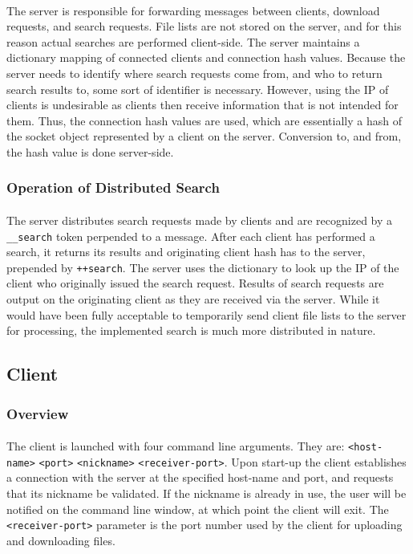 \documentclass[10pt,a4paper]{article}
\begin{document}
\paragraph{} 
The server is responsible for forwarding messages between clients, download requests, and search requests. File lists are not stored on the server, and for this reason actual searches are performed client-side. The server maintains a dictionary mapping of connected clients and connection hash values. Because the server needs to identify where search requests come from, and who to return search results to, some sort of identifier is necessary. However, using the IP of clients is undesirable as clients then receive information that is not intended for them. Thus, the connection hash values are used, which are essentially a hash of the socket object represented by a client on the server. Conversion to, and from, the hash value is done server-side.

\subsubsection{Operation of Distributed Search}
\paragraph{} 
The server distributes search requests made by clients and are recognized by a \verb|__search| token perpended to a message. After each client has performed a search, it returns its results and originating client hash has to the server, prepended by \verb|++search|. The server uses the dictionary to look up the IP of the client who originally issued the search request. Results of search requests are output on the originating client as they are received via the server. While it would have been fully acceptable to temporarily send client file lists to the server for processing, the implemented search is much more distributed in nature. 

\subsection{Client}

\subsubsection{Overview}
\paragraph{} 
The client is launched with four command line arguments. They are: \verb|<host-name>| \verb|<port>| \verb|<nickname>| \verb|<receiver-port>|.
Upon start-up the client establishes a connection with the server at the specified host-name and port, and requests that its nickname be validated.
If the nickname is already in use, the user will be notified on the command line window, at which point the client will exit.
The \verb|<receiver-port>| parameter is the port number used by the client for uploading and downloading files.
\end{document}
